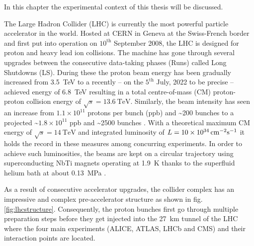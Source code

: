 
In this chapter the experimental context of this thesis will be discussed. 

\label{sec:theory}

The Large Hadron Collider (LHC) is currently the most powerful particle accelerator in the world. Hosted at CERN in Geneva at the Swiss-French border and first put into operation on $\text{10}^\text{th}$ September 2008, the LHC is designed for proton and heavy lead ion collisions. The machine has gone through several upgrades between the consecutive data-taking phases (Runs) called Long Shutdowns (LS). During these the proton beam energy has been gradually increased from \SI{3.5}{\tera\electronvolt} to a recently -- on the $\text{5}^{\text{th}}$ July, 2022 to be precise -- achieved energy of \SI{6.8}{\tera\electronvolt} \cite{Alici:2773265} resulting in a total centre-of-mass (CM) proton-proton collision energy of $\sqrt{s} = \SI{13.6}{\tera\electronvolt}$. Similarly, the beam intensity has seen an increase from $1.1 \times 10^{11}$ protons per bunch (ppb) and \textasciitilde200 bunches to a projected \textasciitilde$1.8 \times 10^{11}$ ppb and \textasciitilde2500 bunches \cite{Fartoukh:2790409, Karastathis:2750302}. With a theoretical maximum CM energy of $\sqrt{s} = \SI{14}{\tera\electronvolt}$ and integrated luminosity of $L = \SI{10d34}{\centi\meter^{-2}\second^{-1}}$ it holds the record in these measures among concurring experiments. In order to achieve such luminosities, the beams are kept on a circular trajectory using superconducting NbTi magnets operating at \SI{1.9}{\kelvin} thanks to the superfluid helium bath at about \SI{0.13}{\mega\pascal} \cite{Brüning:782076}.

As a result of consecutive accelerator upgrades, the collider complex has an impressive and complex pre-accelerator structure as shown in fig. \ref{fig:lhcstructure}. Consequently, the proton bunches first go through multiple preparation steps before they get injected into the \SI{27}{\kilo\meter} tunnel of the LHC where the four main experiments (ALICE, ATLAS, LHCb and CMS) and their interaction points are located. 

